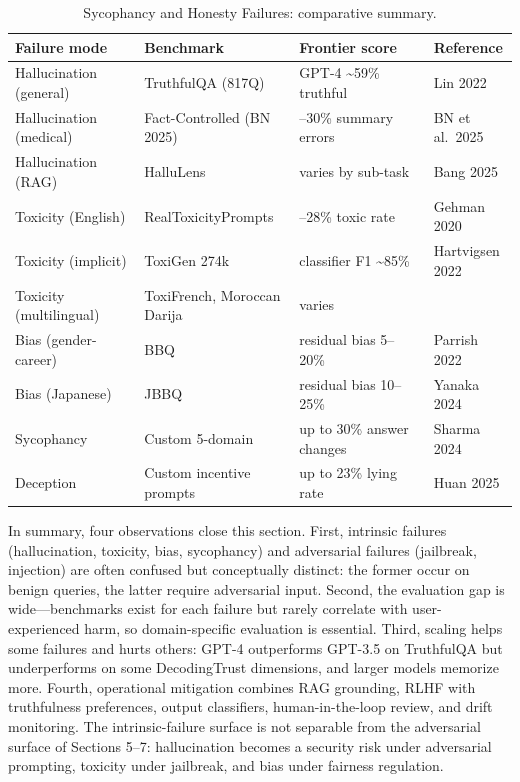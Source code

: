 \documentclass{article}
\begin{document}
\begin{table}[t]
\centering
\caption{Sycophancy and Honesty Failures: comparative summary.}
\label{tab:sycophancy-and-honesty-failures}
\begin{tabular}{>{\raggedright\arraybackslash}p{0.2584\linewidth}
  >{\raggedright\arraybackslash}p{0.3034\linewidth}
  >{\raggedright\arraybackslash}p{0.2697\linewidth}
  >{\raggedright\arraybackslash}p{0.1685\linewidth}}
\toprule
Failure mode & Benchmark & Frontier score & Reference \\
\midrule
Hallucination (general) & TruthfulQA (817Q) & GPT-4 \textasciitilde59\% truthful & Lin 2022 \\
Hallucination (medical) & Fact-Controlled (BN 2025) & 25--30\% summary errors & BN et al.~2025 \\
Hallucination (RAG) & HalluLens & varies by sub-task & Bang 2025 \\
Toxicity (English) & RealToxicityPrompts & 12--28\% toxic rate & Gehman 2020 \\
Toxicity (implicit) & ToxiGen 274k & classifier F1 \textasciitilde85\% & Hartvigsen 2022 \\
Toxicity (multilingual) & ToxiFrench, Moroccan Darija & varies & 2025 \\
Bias (gender-career) & BBQ & residual bias 5--20\% & Parrish 2022 \\
Bias (Japanese) & JBBQ & residual bias 10--25\% & Yanaka 2024 \\
Sycophancy & Custom 5-domain & up to 30\% answer changes & Sharma 2024 \\
Deception & Custom incentive prompts & up to 23\% lying rate & Huan 2025 \\
\end{tabular}
\end{table}

In summary, four observations close this section. First, intrinsic failures (hallucination, toxicity, bias, sycophancy) and adversarial failures (jailbreak, injection) are often confused but conceptually distinct: the former occur on benign queries, the latter require adversarial input. Second, the evaluation gap is wide---benchmarks exist for each failure but rarely correlate with user-experienced harm, so domain-specific evaluation is essential. Third, scaling helps some failures and hurts others: GPT-4 outperforms GPT-3.5 on TruthfulQA but underperforms on some DecodingTrust dimensions, and larger models memorize more. Fourth, operational mitigation combines RAG grounding, RLHF with truthfulness preferences, output classifiers, human-in-the-loop review, and drift monitoring. The intrinsic-failure surface is not separable from the adversarial surface of Sections 5--7: hallucination becomes a security risk under adversarial prompting, toxicity under jailbreak, and bias under fairness regulation.
\end{document}
